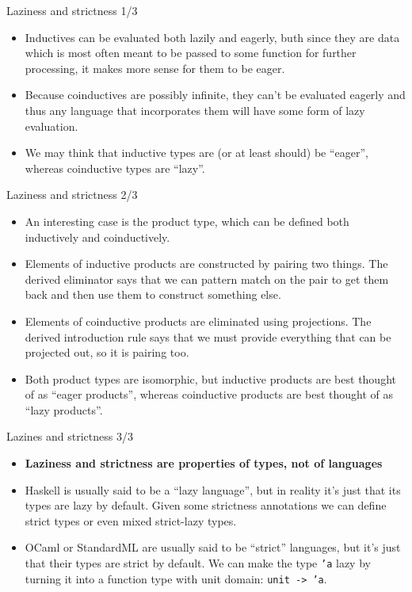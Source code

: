 \documentclass{beamer}
\begin{document}
\begin{frame}{Laziness and strictness 1/3}
\begin{itemize}
	\item Inductives can be evaluated both lazily and eagerly, buth since they are data which is most often meant to be passed to some function for further processing, it makes more sense for them to be eager.
	\item Because coinductives are possibly infinite, they can't be evaluated eagerly and thus any language that incorporates them will have some form of lazy evaluation.
	\item We may think that inductive types are (or at least should) be ``eager'', whereas coinductive types are ``lazy''.
\end{itemize}
\end{frame}

\begin{frame}{Laziness and strictness 2/3}
\begin{itemize}
	\item An interesting case is the product type, which can be defined both inductively and coinductively.
	\item Elements of inductive products are constructed by pairing two things. The derived eliminator says that we can pattern match on the pair to get them back and then use them to construct something else.
	\item Elements of coinductive products are eliminated using projections. The derived introduction rule says that we must provide everything that can be projected out, so it is pairing too.
	\item Both product types are isomorphic, but inductive products are best thought of as ``eager products'', whereas coinductive products are best thought of as ``lazy products''.
\end{itemize}
\end{frame}

\begin{frame}{Lazines and strictness 3/3}
\begin{itemize}
	\item \textbf{Laziness and strictness are properties of types, not of languages}
	\item Haskell is usually said to be a ``lazy language'', but in reality it's just that its types are lazy by default. Given some strictness annotations we can define strict types or even mixed strict-lazy types.
	\item OCaml or StandardML are usually said to be ``strict'' languages, but it's just that their types are strict by default. We can make the type \texttt{'a} lazy by turning it into a function type with unit domain: \texttt{unit -> 'a}.
\end{itemize}
\end{frame}
\end{document}
